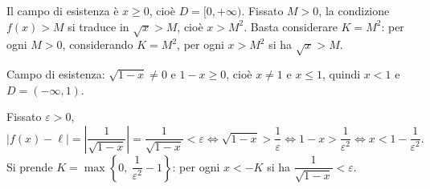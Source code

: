 \documentclass[11pt,a4paper]{article}
\begin{document}
\begin{esempio}[$\lim_{x\to+\infty}\sqrt{x} = +\infty$]
Il campo di esistenza è $x \ge 0$, cioè $D = [0, +\infty)$. Fissato $M > 0$, la condizione $f(x) > M$ si traduce in $\sqrt{x} > M$, cioè $x > M^2$. Basta considerare $K = M^2$: per ogni $M > 0$, considerando $K = M^2$, per ogni $x > M^2$ si ha $\sqrt{x} > M$.
\end{esempio}

\begin{esempio}[$\lim_{x\to-\infty}\frac{1}{\sqrt{1-x}} = 0$]
Campo di esistenza: $\sqrt{1-x} \neq 0$ e $1 - x \ge 0$, cioè $x \ne 1$ e $x \le 1$, quindi $x < 1$ e $D = (-\infty, 1)$.

Fissato $\varepsilon > 0$,
\[
|f(x) - \ell| = \left| \frac{1}{\sqrt{1-x}} \right| = \frac{1}{\sqrt{1-x}} < \varepsilon
\iff \sqrt{1-x} > \frac{1}{\varepsilon}
\iff 1 - x > \frac{1}{\varepsilon^2}
\iff x < 1 - \frac{1}{\varepsilon^2} .
\]
Si prende $K = \max\left\{0,\ \dfrac{1}{\varepsilon^2} - 1\right\}$: per ogni $x < -K$ si ha $\dfrac{1}{\sqrt{1-x}} < \varepsilon$.
\end{esempio}
\end{document}
